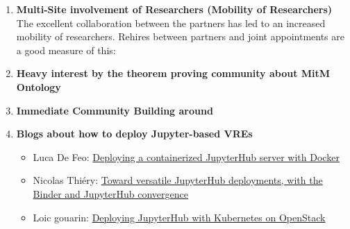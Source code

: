 \begin{enumerate}
\item \textbf{Multi-Site involvement of Researchers (Mobility of Researchers)}\\
  The excellent collaboration between the \ODK partners has led to an
  increased mobility of researchers. Rehires between partners and
  joint appointments are a good measure of this:
\item \textbf{Heavy interest by the theorem proving community about MitM Ontology}
\item \textbf{Immediate Community Building around \dhm}
\item \textbf{Blogs about how to deploy Jupyter-based VREs}
  \begin{itemize}
  \item Luca De Feo: \href{https://opendreamkit.org/2018/10/17/jupyterhub-docker/}{Deploying a containerized JupyterHub server with Docker}
  \item Nicolas Thiéry: \href{https://opendreamkit.org/2018/03/15/jupyterhub-binder-convergence/}{Toward versatile JupyterHub deployments, with the Binder and JupyterHub convergence}
  \item Loic gouarin: \href{https://blog.jupyter.org/how-to-deploy-jupyterhub-with-kubernetes-on-openstack-f8f6120d4b1}{Deploying JupyterHub with Kubernetes on OpenStack}
  \end{itemize}
\end{enumerate}

